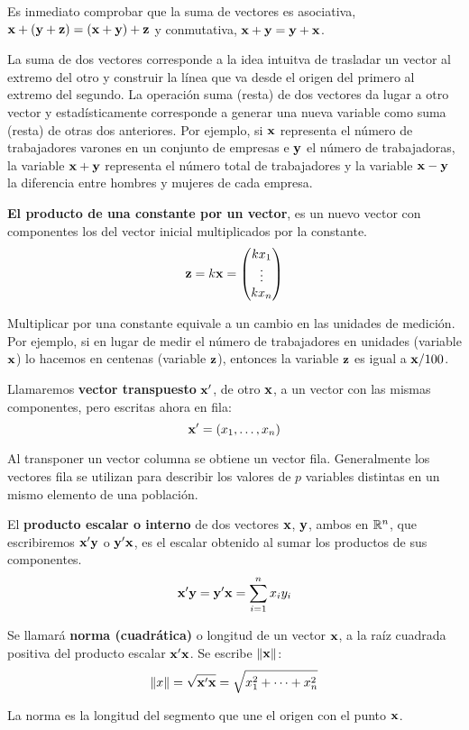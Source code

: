 Es inmediato comprobar que la suma de vectores es asociativa, $\mathbf{x}+(\mathbf{y}+\mathbf{z})=(\mathbf{x}+\mathbf{y})+\mathbf{z}$ y conmutativa, $\mathbf{x}+\mathbf{y}=\mathbf{y}+\mathbf{x}$.

La suma de dos vectores corresponde a la idea intuitva de trasladar un vector al extremo del otro y construir la línea que va desde el origen del primero al extremo del segundo. La operación suma (resta) de dos vectores da lugar a otro vector y estadísticamente corresponde a generar una nueva variable como suma (resta) de otras dos anteriores. Por ejemplo, si $\mathbf{x}$ representa el número de trabajadores varones en un conjunto de empresas e $\mathbf{y}$ el número de trabajadoras, la variable $\mathbf{x}+\mathbf{y}$ representa el número total de trabajadores y la variable $\mathbf{x}-\mathbf{y}$ la diferencia entre hombres y mujeres de cada empresa.

\textbf{El producto de una constante por un vector}, es un nuevo vector con componentes los del vector inicial multiplicados por la constante.
$$\mathbf{z}=k\mathbf{x}=\begin{pmatrix}
    kx_1 \\
    \vdots \\
    kx_n
\end{pmatrix}$$

Multiplicar por una constante equivale a un cambio en las unidades de medición. Por ejemplo, si en lugar de medir el número de trabajadores en unidades (variable $\mathbf{x}$) lo hacemos en centenas (variable $\mathbf{z}$), entonces la variable $\mathbf{z}$ es igual a $\mathbf{x}/100$.

Llamaremos \textbf{vector transpuesto} $\mathbf{x}'$, de otro $\mathbf{x}$, a un vector con las mismas componentes, pero escritas ahora en fila:
$$\mathbf{x}'=\left(x_1,\dots,x_n\right)$$

Al transponer un vector columna se obtiene un vector fila. Generalmente los vectores fila se utilizan para describir los valores de $p$ variables distintas en un mismo elemento de una población.

El \textbf{producto escalar o interno} de dos vectores $\mathbf{x}$, $\mathbf{y}$, ambos en $\mathbb{R}^n$, que escribiremos $\mathbf{x}'\mathbf{y}$ o $\mathbf{y}'\mathbf{x}$, es el escalar obtenido al sumar los productos de sus componentes.
$$\mathbf{x}'\mathbf{y}=\mathbf{y}'\mathbf{x}=\sum_{i=1}^nx_iy_i$$

Se llamará \textbf{norma (cuadrática)} o longitud de un vector $\mathbf{x}$, a la raíz cuadrada positiva del producto escalar $\mathbf{x}'\mathbf{x}$. Se escribe $\left\| \mathbf{x}\right\|$:
$$\left\| x\right\|=\sqrt{\mathbf{x}'\mathbf{x}}=\sqrt{x_1^2+\cdots+x_n^2}$$

La norma es la longitud del segmento que une el origen con el punto $\mathbf{x}$.


